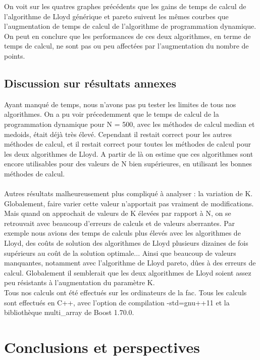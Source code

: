 ﻿\documentclass{meta}
\begin{document}
{On voit sur les quatres graphes précédents que les gains de temps de calcul de l'algorithme de Lloyd générique et pareto suivent les mêmes courbes que l'augmentation de temps de calcul de l'algorithme de programmation dynamique. On peut en conclure que les performances de ces deux algorithmes, en terme de temps de calcul, ne sont pas ou peu affectées par l'augmentation du nombre de points.

\subsection{Discussion sur résultats annexes}
Ayant manqué de temps, nous n'avons pas pu tester les limites de tous nos algorithmes. On a pu voir précedemment que le temps de calcul de la programmation dynamique pour N = 500, avec les méthodes de calcul median et medoids, était déjà très élevé. Cependant il restait correct pour les autres méthodes de calcul, et il restait correct pour toutes les méthodes de calcul pour les deux algorithmes de Lloyd. A partir de là on estime que ces algorithmes sont encore utilisables pour des valeurs de N bien supérieures, en utilisant les bonnes méthodes de calcul.\\ \\
Autres résultats malheureusement plus compliqué à analyser : la variation de K. Globalement, faire varier cette valeur n'apportait pas vraiment de modifications. Mais quand on approchait de valeurs de K élevées par rapport à N, on se retrouvait avec beaucoup d'erreurs de calculs et de valeurs aberrantes. Par exemple nous avions des temps de calculs plus élevés avec les algorithmes de Lloyd, des coûts de solution des algorithmes de Lloyd plusieurs dizaines de fois supérieurs au coût de la solution optimale... Ainsi que beaucoup de valeurs manquantes, notamment avec l'algorithme de Lloyd pareto, dûes à des erreurs de calcul. Globalement il semblerait que les deux algorithmes de Lloyd soient assez peu résistants à l'augmentation du paramètre K.\\

Tous nos calculs ont été effectués sur les ordinateurs de la fac. Tous les calculs sont effectués en C++, avec l'option de compilation -std=gnu++11 et la bibliothèque multi\_array de Boost 1.70.0.

\section{Conclusions et perspectives}

}
\end{document}
